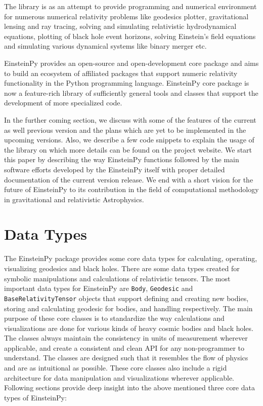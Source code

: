 \documentclass[refree]{aa}
\begin{document}
   The library is as an attempt to provide programming and numerical environment 
   for numerous numerical relativity problems like geodesics plotter, gravitational 
   lensing and ray tracing, solving and simulating relativistic hydrodynamical  
   equations, plotting of black hole event horizons, solving Einstein’s 
   field equations and simulating various dynamical systems like binary merger etc.
   
   EinsteinPy provides an open-source and open-development core package and 
   aims to build an ecosystem of affiliated packages that support numeric 
   relativity functionality in the Python programming language. EinsteinPy 
   core package is now a feature-rich library of sufficiently general tools 
   and classes that support the development of more specialized code.
   
   In the further coming section, we discuss with some of the features of the 
   current as well previous version and the plans which are yet to be implemented 
   in the upcoming versions. Also, we describe a few code snippets to explain 
   the usage of the library on which more details can be found on the 
   project website. We start this paper by describing the way EinsteinPy functions 
   followed by the main software efforts developed by the EinsteinPy itself 
   with proper detailed documentation of the current version release. We end 
   with a short vision for the future of EinsteinPy to its contribution in 
   the field of computational methodology in gravitational and 
   relativistic Astrophysics.

\section{Data Types}

  The EinsteinPy package provides some core data types for calculating, 
  operating, visualizing geodesics and black holes. There are some data 
  types created for symbolic manipulations and calculations of relativistic 
  tensors. The most important data types for EinsteinPy are \texttt{Body}, 
  \texttt{Geodesic} and \texttt{BaseRelativityTensor} objects that support 
  defining and creating new bodies, storing and calculating geodesic for 
  bodies, and handling respectively. The main purpose of these core classes 
  is to standardize the way calculations and visualizations are done for 
  various kinds of heavy cosmic bodies and black holes. The classes always 
  maintain the consistency in units of measurement wherever applicable, and 
  create a consistent and clean API for any non-programmer to understand. 
  The classes are designed such that it resembles the flow of physics and 
  are as intuitional as possible. These core classes also include a rigid 
  architecture for data manipulation and visualizations wherever applicable. 
  Following sections provide deep insight into the above mentioned three 
  core data types of EinsteinPy:
  
\end{document}

